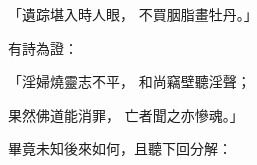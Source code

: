 \begin{showcontents}{}
「遺踪堪入時人眼，  不買胭脂畫牡丹。」

有詩為證：

「淫婦燒靈志不平，  和尚竊壁聽淫聲；

果然佛道能消罪，  亡者聞之亦慘魂。」

畢竟未知後來如何，且聽下回分解：



\end{showcontents}

